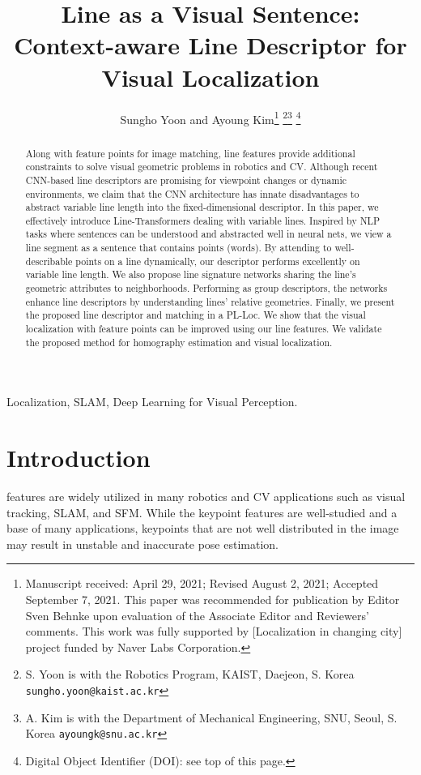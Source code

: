 \documentclass[letterpaper, 10 pt, journal, twoside]{ieeetran}
\title{\LARGE \bf
Line as a Visual Sentence: \\
Context-aware Line Descriptor for Visual Localization
}
\author{Sungho Yoon and Ayoung Kim\thanks{Manuscript received: April 29, 2021; Revised August 2, 2021; Accepted September 7, 2021. This paper was recommended for publication by Editor Sven Behnke upon evaluation of the Associate Editor and Reviewers' comments. This work was fully supported by [Localization in changing city] project funded by Naver Labs Corporation.} \thanks{S. Yoon is with the Robotics Program,
        KAIST, Daejeon, S. Korea {\tt\footnotesize sungho.yoon@kaist.ac.kr}}\thanks{A. Kim is with the Department of Mechanical Engineering, SNU, Seoul, S. Korea {\tt\footnotesize ayoungk@snu.ac.kr}}
\thanks{Digital Object Identifier (DOI): see top of this page.}
}
\begin{document}
\maketitle


\begin{abstract}
Along with feature points for image matching, line features provide additional constraints to solve visual geometric problems in robotics and \ac{CV}. Although recent \ac{CNN}-based line descriptors are promising for viewpoint changes or dynamic environments, we claim that the \ac{CNN} architecture has innate disadvantages to abstract variable line length into the fixed-dimensional descriptor. In this paper, we effectively introduce Line-Transformers dealing with variable lines. Inspired by \ac{NLP} tasks where sentences can be understood and abstracted well in neural nets, we view a line segment as a sentence that contains points (words). By attending to well-describable points on a line dynamically, our descriptor performs excellently on variable line length. We also propose line signature networks sharing the line's geometric attributes to neighborhoods. Performing as group descriptors, the networks enhance line descriptors by understanding lines' relative geometries. Finally, we present the proposed line descriptor and matching in a \ac{PL-Loc}. We show that the visual localization with feature points can be improved using our line features. We validate the proposed method for homography estimation and visual localization.
\end{abstract}

\begin{IEEEkeywords}
Localization, SLAM, Deep Learning for Visual Perception.
\end{IEEEkeywords}

\section{Introduction}
\label{sec:intro}


 features are widely utilized in many robotics and \acf{CV} applications such as visual tracking, \ac{SLAM}, and \ac{SFM}. While the keypoint features are well-studied and a base of many applications, keypoints that are not well distributed in the image may result in unstable and inaccurate pose estimation.
\end{document}
